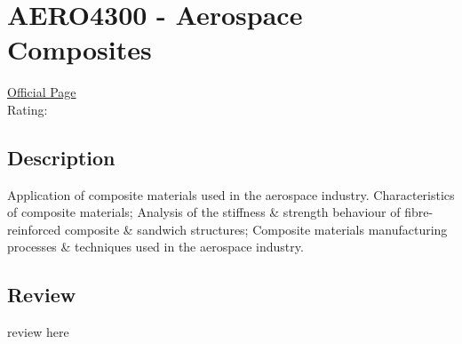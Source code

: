 \hypertarget{AERO4300}{\section{AERO4300 - Aerospace Composites}}

\large
\textcolor{turbo_purple}{\href{https://my.uq.edu.au/programs-courses/course.html?course_code=AERO4300}{Official Page}} \\
Rating: \cstar\cstar\cstar\cstar\ostar

\normalsize
\subsection*{Description}
Application of composite materials used in the aerospace industry.
Characteristics of composite materials; Analysis of the stiffness \& strength behaviour of fibre-reinforced composite \& sandwich structures; Composite materials manufacturing processes \& techniques used in the aerospace industry.

\subsection*{Review}
review here
